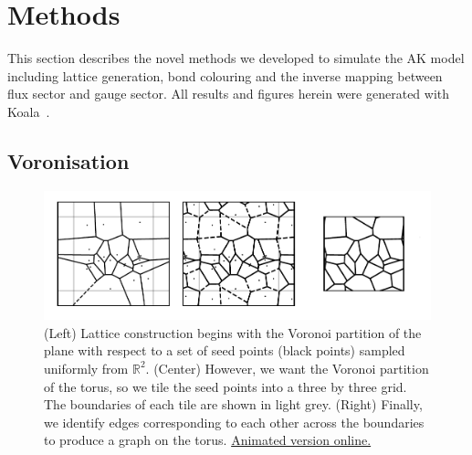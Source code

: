 \hypertarget{amk-methods}{%
\section{Methods}\label{amk-methods}}

This section describes the novel methods we developed to simulate the AK model including lattice generation, bond colouring and the inverse mapping between flux sector and gauge sector. All results and figures herein were generated with Koala~\autocite{hodsonKoalaKitaevAmorphous2022}.

\hypertarget{voronisation}{%
\subsection{Voronisation}\label{voronisation}}

\hypertarget{fig:lattice_construction_animated}{%
\begin{figure}
\centering
\includegraphics[width=1\textwidth,height=\textheight]{figure_code/amk_chapter/lattice_construction_animated/lattice_construction_animated}
\caption[{Lattice Construction}]{(Left) Lattice construction begins with the Voronoi partition of the plane with respect to a set of seed points (black points) sampled uniformly from \(\mathbb{R}^2\). (Center) However, we want the Voronoi partition of the torus, so we tile the seed points into a three by three grid. The boundaries of each tile are shown in light grey. (Right) Finally, we identify edges corresponding to each other across the boundaries to produce a graph on the torus. \href{http://thomashodson.com/assets/thesis/amk_chapter/lattice_construction_animated/lattice_construction_animated.gif}{ Animated version online.}}
\label{fig:lattice_construction_animated}
\end{figure}
}

